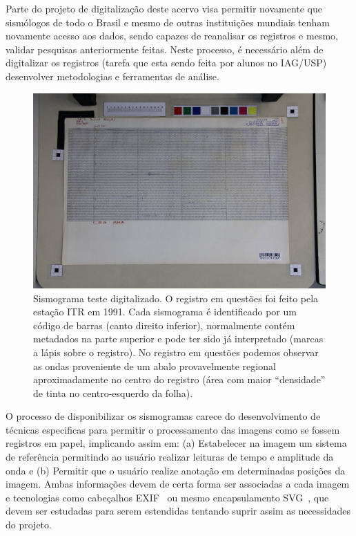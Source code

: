\documentclass{article}
\begin{document}
Parte do projeto de digitalização deste acervo visa permitir novamente
que sismólogos de todo o Brasil e mesmo de outras instituições
mundiais tenham novamente acesso aos dados, sendo capazes de
reanalisar os registros e mesmo, validar pesquisas anteriormente
feitas. Neste processo, é necessário além de digitalizar os registros
(tarefa que esta sendo feita por alunos no IAG/USP) desenvolver
metodologias e ferramentas de análise.
\begin{figure}[htb]
  \begin{center}
    \includegraphics[scale=0.25]{sismograma.jpg}
\caption{Sismograma teste digitalizado. O registro em questões foi
  feito pela estação ITR em 1991. Cada sismograma é identificado por
  um código de barras (canto direito inferior), normalmente contém
  metadados na parte superior e pode ter sido já interpretado (marcas
  a lápis sobre o registro). No registro em questões podemos observar
  as ondas proveniente de um abalo provavelmente regional
  aproximadamente no centro do registro (área com maior “densidade” de
  tinta no centro-esquerdo da folha).}
\label{sismograma}
\end{center}
\end{figure}
O processo de disponibilizar os sismogramas carece do desenvolvimento
de técnicas especificas para permitir o processamento das imagens como
se fossem registros em papel, implicando assim em: (a) Estabelecer na
imagem um sistema de referência permitindo ao usuário realizar
leituras de tempo e amplitude da onda e (b) Permitir que o usuário
realize anotação em determinadas posições da imagem. Ambas
informações devem de certa forma ser associadas a cada imagem e
tecnologias como cabeçalhos EXIF~\cite{exif} ou mesmo encapsulamento
SVG~\cite{svg}, que devem ser estudadas para serem estendidas tentando
suprir assim as necessidades do projeto. 
\end{document}
